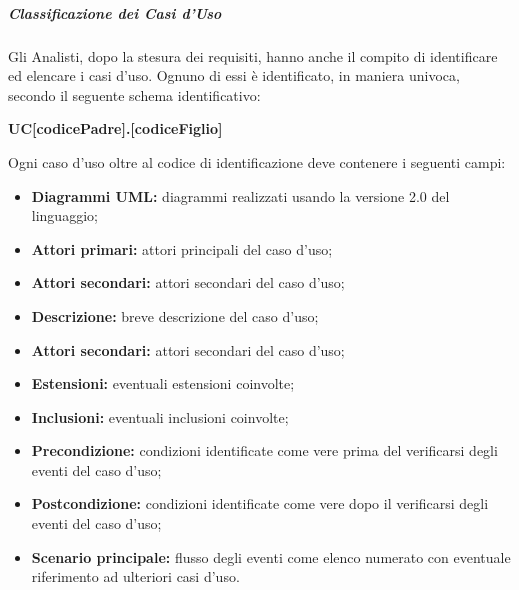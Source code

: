 				\subparagraph{Classificazione dei Casi d'Uso}
					Gli Analisti, dopo la stesura dei requisiti, hanno anche il compito di identificare ed elencare i casi d’uso. Ognuno di essi è identificato, in maniera univoca, secondo il seguente schema identificativo:
					\begin{center}
						\textbf{UC[codicePadre].[codiceFiglio]}
					\end{center}
					Ogni caso d'uso oltre al codice di identificazione deve contenere i seguenti campi:
					\begin{itemize}
						\item \textbf{Diagrammi UML:} diagrammi realizzati usando la versione 2.0 del linguaggio;
						\item \textbf{Attori primari:} attori principali del caso d’uso; 
						\item \textbf{Attori secondari:} attori secondari del caso d’uso;
						\item \textbf{Descrizione:} breve descrizione del caso d'uso;
						\item \textbf{Attori secondari:} attori secondari del caso d’uso;
						\item \textbf{Estensioni:} eventuali estensioni coinvolte;
						\item \textbf{Inclusioni:} eventuali inclusioni coinvolte;
						\item \textbf{Precondizione:} condizioni identificate come vere prima del verificarsi degli eventi del caso d’uso;
						\item \textbf{Postcondizione:} condizioni identificate come vere dopo il verificarsi degli eventi del caso d’uso;
						\item \textbf{Scenario principale:} flusso degli eventi come elenco numerato con eventuale riferimento ad ulteriori casi d’uso.
					\end{itemize}
				
